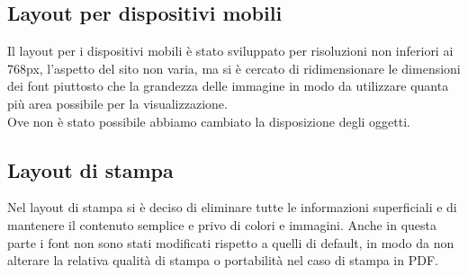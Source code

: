 \documentclass[11pt]{article}
\begin{document}
\subsection{Layout per dispositivi mobili}
Il layout per i dispositivi mobili è stato sviluppato per risoluzioni non inferiori ai 768px, l'aspetto del sito non varia, ma si è cercato di ridimensionare le dimensioni dei font piuttosto che la grandezza delle immagine in modo da utilizzare quanta più area possibile per la visualizzazione.
\\Ove non è stato possibile abbiamo cambiato la disposizione degli oggetti.

\subsection{Layout di stampa}
Nel layout di stampa si è deciso di eliminare tutte le informazioni superficiali e di mantenere il contenuto semplice e privo di colori e immagini. Anche in questa parte i font non sono stati modificati rispetto a quelli di default, in modo da non alterare la relativa qualità di stampa o portabilità nel caso di stampa in PDF.
\newpage
\end{document}
